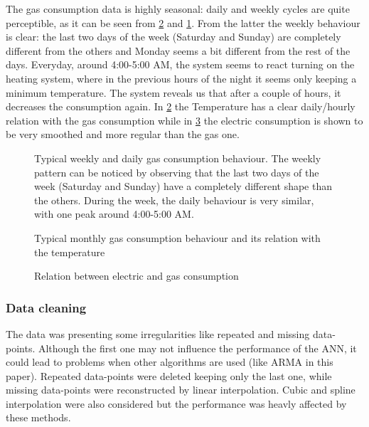 \documentclass{sig-alternate-sigmod07}
\begin{document}
The gas consumption data is highly seasonal: daily and weekly cycles are quite perceptible, as it can be seen from \cref{fig:monthlyTGas} and \cref{fig:dailyBehaviour}. From the latter the weekly behaviour is clear: the last two days of the week (Saturday and Sunday) are completely different from the others and Monday seems a bit different from the rest of the days. Everyday, around 4:00-5:00 AM, the system seems to react turning on the heating system, where in the previous hours of the night it seems only keeping a minimum temperature. The system reveals us that after a couple of hours, it decreases the consumption again.
In \cref{fig:monthlyTGas} the Temperature has a clear daily/hourly relation with the gas consumption while in \cref{fig:monthlyGasElectr} the electric consumption is shown to be very smoothed and more regular than the gas one.


\begin{figure}[h!]
\centering
{}
\caption{Typical weekly and daily gas consumption behaviour. The weekly pattern can be noticed by observing that the last two days of the week (Saturday and Sunday) have a completely different shape than the others. During the week, the daily behaviour is very similar, with one peak around 4:00-5:00 AM.}
\label{fig:dailyBehaviour}
\end{figure}

\begin{figure}[h!]
\centering
{}
\caption{Typical monthly gas consumption behaviour and its relation with the temperature}
\label{fig:monthlyTGas}
\end{figure}

\begin{figure}[h!]
\centering
{}
\caption{Relation between electric and gas consumption}
\label{fig:monthlyGasElectr}
\end{figure}


\subsubsection{Data cleaning}
\label{sec:cleaning}
The data was presenting some irregularities like repeated and missing data-points. Although the first one may not influence the performance of the ANN, it could lead to problems when other algorithms are used (like ARMA in this paper). Repeated data-points were deleted keeping only the last one, while missing data-points were reconstructed by linear interpolation. Cubic and spline interpolation were also considered but the performance was heavly affected by these methods.
\end{document}
